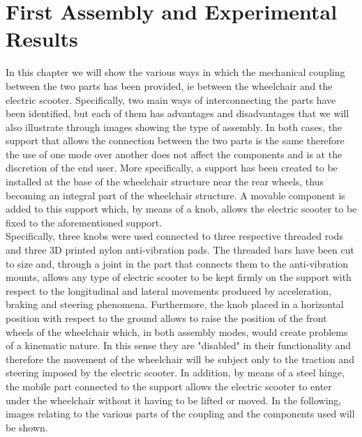 \documentclass[binding=0.6cm,LaM,noexaminfo]{sapthesis}
\begin{document}
\chapter{First Assembly and Experimental Results}
In this chapter we will show the various ways in which the mechanical coupling between the two parts has been provided, ie between the wheelchair and the electric scooter. Specifically, two main ways of interconnecting the parts have been identified, but each of them has advantages and disadvantages that we will also illustrate through images showing the type of assembly. In both cases, the support that allows the connection between the two parts is the same therefore the use of one mode over another does not affect the components and is at the discretion of the end user. More specifically, a support has been created to be installed at the base of the wheelchair structure near the rear wheels, thus becoming an integral part of the wheelchair structure. A movable component is added to this support which, by means of a knob, allows the electric scooter to be fixed to the aforementioned support.\\
Specifically, three knobs were used connected to three respective threaded rods and three 3D printed nylon anti-vibration pads. The threaded bars have been cut to size and, through a joint in the part that connects them to the anti-vibration mounts, allows any type of electric scooter to be kept firmly on the support with respect to the longitudinal and lateral movements produced by acceleration, braking and steering phenomena. Furthermore, the knob placed in a horizontal position with respect to the ground allows to raise the position of the front wheels of the wheelchair which, in both assembly modes, would create problems of a kinematic nature. In this sense they are "disabled" in their functionality and therefore the movement of the wheelchair will be subject only to the traction and steering imposed by the electric scooter. In addition, by means of a steel hinge, the mobile part connected to the support allows the electric scooter to enter under the wheelchair without it having to be lifted or moved. In the following, images relating to the various parts of the coupling and the components used will be shown.
\end{document}
